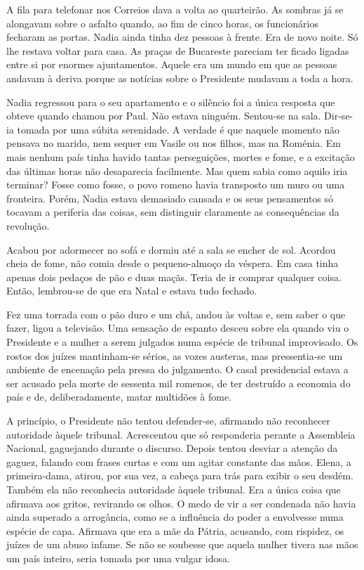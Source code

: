 A fila para telefonar nos Correios dava a volta ao quarteirão. As
sombras já se alongavam sobre o asfalto quando, ao fim de cinco horas,
os funcionários fecharam as portas. Nadia ainda tinha dez pessoas à
frente. Era de novo noite. Só lhe restava voltar para casa. As praças de
Bucareste pareciam ter ficado ligadas entre si por enormes ajuntamentos. Aquele era um mundo em que as pessoas andavam à deriva porque as
notícias sobre o Presidente mudavam a toda a hora.

Nadia regressou para o seu apartamento e o silêncio foi a única resposta
que obteve quando chamou por Paul. Não estava ninguém. Sentou-se na
sala. Dir-se-ia tomada por uma súbita serenidade. A verdade é que
naquele momento não pensava no marido, nem sequer em Vasile ou nos
filhos, mas na Roménia. Em mais nenhum país tinha havido tantas
perseguições, mortes e fome, e a excitação das últimas horas não
desaparecia facilmente. Mas quem sabia como aquilo iria terminar? Fosse
como fosse, o povo romeno havia transposto um muro ou uma fronteira.
Porém, Nadia estava demasiado cansada e os seus pensamentos só tocavam a
periferia das coisas, sem distinguir claramente as consequências da
revolução.

Acabou por adormecer no sofá e dormiu até a sala se
encher de sol. Acordou cheia de fome, não comia desde o pequeno-almoço
da véspera. Em casa tinha apenas dois
pedaços de pão e duas maçãs. Teria de ir comprar qualquer coisa. Então,
lembrou-se de que era Natal e estava tudo fechado.

Fez uma torrada com o pão duro e um chá, andou às voltas e, sem saber o
que fazer, ligou a televisão. Uma sensação de espanto desceu sobre ela
quando viu o Presidente e a mulher a serem julgados numa espécie de
tribunal improvisado. Os rostos dos juízes mantinham-se sérios, as
vozes austeras, mas pressentia-se um ambiente de encenação pela pressa
do julgamento. O casal presidencial estava a ser acusado pela morte de
sessenta mil romenos, de ter destruído a economia do país e de,
deliberadamente, matar multidões à fome.

A princípio, o Presidente não tentou defender-se, afirmando não
reconhecer autoridade àquele tribunal. Acrescentou que só responderia
perante a Assembleia Nacional, gaguejando durante o discurso. Depois
tentou desviar a atenção da gaguez, falando com frases curtas e com um
agitar constante das mãos. Elena, a primeira-dama, atirou, por sua vez,
a cabeça para trás para exibir o seu desdém. Também ela não reconhecia
autoridade àquele tribunal. Era a única coisa que afirmava aos gritos,
revirando os olhos. O medo de vir a ser condenada não havia ainda
superado a arrogância, como se a influência do poder a envolvesse numa
espécie de capa. Afirmava que era a mãe da Pátria, acusando, com
rispidez, os juízes de um abuso infame. Se não se soubesse que aquela
mulher tivera nas mãos um país inteiro, seria tomada por uma vulgar
idosa.

